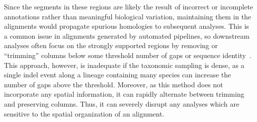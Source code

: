 
Since the segments in these regions are likely the result of incorrect or incomplete annotations rather than meaningful biological variation, maintaining them in the alignments would propagate spurious homologies to subsequent analyses. This is a common issue in alignments generated by automated pipelines, so downstream analyses often focus on the strongly supported regions by removing or ``trimming'' columns below some threshold number of gaps or sequence identity~\cite{Castresana2000, CapellaGutierrez2009}. This approach, however, is inadequate if the taxonomic sampling is dense, as a single indel event along a lineage containing many species can increase the number of gaps above the threshold. Moreover, as this method does not incorporate any spatial information, it can rapidly alternate between trimming and preserving columns. Thus, it can severely disrupt any analyses which are sensitive to the spatial organization of an alignment.

